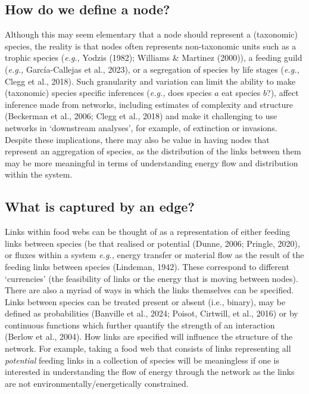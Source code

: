 \documentclass[
]{article}
\begin{document}
\subsection{How do we define a node?}\label{how-do-we-define-a-node}

Although this may seem elementary that a node should represent a
(taxonomic) species, the reality is that nodes often represents
non-taxonomic units such as a trophic species (\emph{e.g.,} Yodzis
(1982); Williams \& Martinez (2000)), a feeding guild (\emph{e.g.,}
García-Callejas et al., 2023), or a segregation of species by life
stages (\emph{e.g.,} Clegg et al., 2018). Such granularity and variation
can limit the ability to make (taxonomic) species specific inferences
(\emph{e.g.,} does species \(a\) eat species \(b\)?), affect inference
made from networks, including estimates of complexity and structure
(Beckerman et al., 2006; Clegg et al., 2018) and make it challenging to
use networks in `downstream analyses', for example, of extinction or
invasions. Despite these implications, there may also be value in having
nodes that represent an aggregation of species, as the distribution of
the links between them may be more meaningful in terms of understanding
energy flow and distribution within the system.

\subsection{What is captured by an
edge?}\label{what-is-captured-by-an-edge}

Links within food webs can be thought of as a representation of either
feeding links between species (be that realised or potential (Dunne,
2006; Pringle, 2020), or fluxes within a system \emph{e.g.,} energy
transfer or material flow as the result of the feeding links between
species (Lindeman, 1942). These correspond to different `currencies'
(the feasibility of links or the energy that is moving between nodes).
There are also a myriad of ways in which the links themselves can be
specified. Links between species can be treated present or absent (i.e.,
binary), may be defined as probabilities (Banville et al., 2024; Poisot,
Cirtwill, et al., 2016) or by continuous functions which further
quantify the strength of an interaction (Berlow et al., 2004). How links
are specified will influence the structure of the network. For example,
taking a food web that consists of links representing all
\emph{potential} feeding links in a collection of species will be
meaningless if one is interested in understanding the flow of energy
through the network as the links are not environmentally/energetically
constrained.
\end{document}
